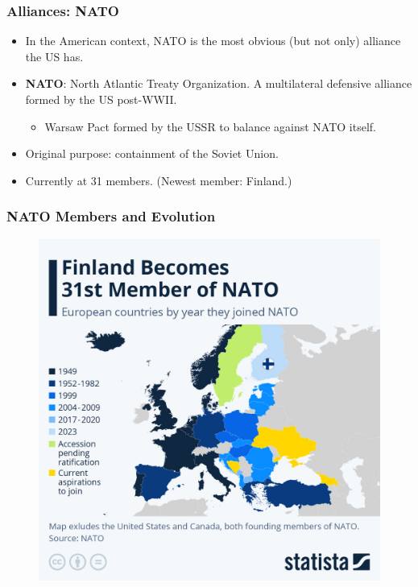 \documentclass{beamer}
\begin{document}
\begin{frame} 
	\frametitle{\LARGE{Alliances: NATO}}
	\begin{itemize}
		\item In the American context, NATO is the most obvious (but not only) alliance the US has. \pause
		\item \textbf{NATO}: North Atlantic Treaty Organization. A multilateral defensive alliance formed by the US post-WWII. \pause
		\begin{itemize}
			\item Warsaw Pact formed by the USSR to balance against NATO itself. \pause
		\end{itemize}
		\item Original purpose: containment of the Soviet Union. \pause
		\item Currently at 31 members. (Newest member: Finland.)
	\end{itemize}
\end{frame}

\begin{frame} 
	\frametitle{\LARGE{NATO Members and Evolution}}
	\begin{figure}[ht!]
		\centering
		\includegraphics[width=\textwidth,height=\textheight, keepaspectratio]{NATO2023.jpeg}
	\end{figure}
\end{frame}
\end{document}

